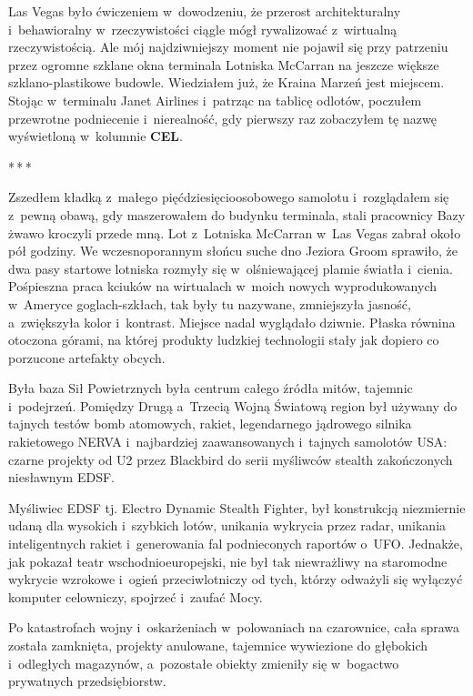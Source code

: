 \documentclass[oneside,polish,12pt,sfheadings]{mwbk}
\newcommand{\threeast}{\bigskip\par\centerline{*\,*\,*}\medskip\par}%
\begin{document}
Las Vegas było ćwiczeniem w~dowodzeniu, że przerost architekturalny i~behawioralny w~rzeczywistości ciągle mógł rywalizować z~wirtualną
rzeczywistością. Ale mój najdziwniejszy moment nie pojawił się przy
patrzeniu przez ogromne szklane okna terminala Lotniska McCarran na
jeszcze większe szklano-plastikowe budowle. Wiedziałem już, że Kraina
Marzeń jest miejscem. Stojąc w~terminalu Janet Airlines i~patrząc na
tablicę odlotów, poczułem przewrotne podniecenie i~nierealność, gdy
pierwszy raz zobaczyłem tę nazwę wyświetloną w~kolumnie \textbf{CEL}.

\threeast

Zszedłem kładką z~małego pięćdziesięcioosobowego samolotu i~rozglądałem
się z~pewną obawą, gdy maszerowałem do budynku terminala, stali
pracownicy Bazy żwawo kroczyli przede mną. Lot z~Lotniska McCarran w~Las
Vegas zabrał około pół godziny. We wczesnoporannym słońcu suche dno
Jeziora Groom sprawiło, że dwa pasy startowe lotniska rozmyły się w~olśniewającej plamie światła i~cienia. Pośpieszna praca kciuków na
wirtualach w~moich nowych wyprodukowanych w~Ameryce goglach-szkłach, tak
były tu nazywane, zmniejszyła jasność, a~zwiększyła kolor i~kontrast.
Miejsce nadal wyglądało dziwnie. Płaska równina otoczona górami, na
której produkty ludzkiej technologii stały jak dopiero co porzucone
artefakty obcych.

Była baza Sił Powietrznych była centrum całego źródła mitów, tajemnic i~podejrzeń. Pomiędzy Drugą a~Trzecią Wojną Światową region był używany do
tajnych testów bomb atomowych, rakiet, legendarnego jądrowego silnika
rakietowego NERVA i~najbardziej zaawansowanych i~tajnych samolotów USA:
czarne projekty od U2 przez Blackbird do serii myśliwców stealth
zakończonych niesławnym EDSF. 

Myśliwiec EDSF tj. Electro Dynamic Stealth Fighter, 
był konstrukcją niezmiernie udaną dla wysokich i~szybkich
lotów, unikania wykrycia przez radar, unikania inteligentnych rakiet i~generowania fal podnieconych raportów o~UFO. Jednakże, jak pokazał teatr
wschodnioeuropejski, nie był tak niewrażliwy na staromodne wykrycie
wzrokowe i~ogień przeciwlotniczy od tych, którzy odważyli się wyłączyć
komputer celowniczy, spojrzeć i~zaufać Mocy.

Po katastrofach wojny i~oskarżeniach w~polowaniach na czarownice, cała
sprawa została zamknięta, projekty anulowane, tajemnice wywiezione do
głębokich i~odległych magazynów, a~pozostałe obiekty zmieniły się w~bogactwo prywatnych przedsiębiorstw.
\end{document}
